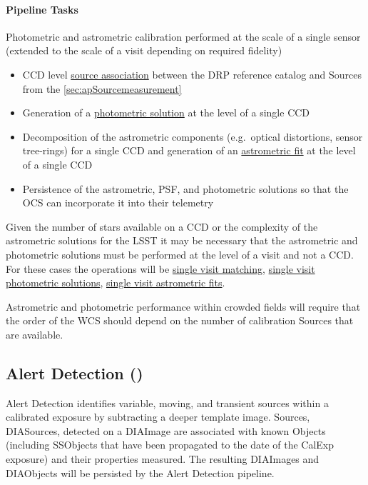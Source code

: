 \paragraph{Pipeline Tasks}
Photometric and astrometric calibration performed at the scale of a
single sensor (extended to the scale of a visit depending on required fidelity)
\begin{itemize}
\item CCD level \hyperref[sec:acSingleCCDReferenceMatching]{source
    association} between the DRP reference catalog and Sources from the \ref{sec:apSourcemeasurement}
\item Generation of a \hyperref[sec:acSingleCCDPhotometricFit]{photometric solution} at the level of a single CCD
\item Decomposition of the astrometric components (e.g.\ optical distortions, sensor tree-rings) for a single CCD and generation of an \hyperref[sec:acSingleCCDAstrometricFit]{astrometric fit} at the level of a single CCD
\item Persistence of the astrometric, PSF, and photometric solutions so that the OCS can incorporate it into their telemetry
\end{itemize}

Given the number of stars available on a CCD or the complexity of the astrometric solutions for the LSST it may be necessary that the astrometric and photometric solutions must be performed at the level of a visit and not a CCD.  For these cases the operations will be \hyperref[sec:acSingleVisitReferenceMatching]{single visit matching},   \hyperref[sec:acSingleCCDPhotometricFit]{single visit photometric solutions}, \hyperref[sec:acSingleVisitAstrometricFit]{single visit astrometric fits}.

Astrometric and photometric performance within crowded fields will require that the order of the WCS should depend on the number of calibration Sources that are available.

\subsection{Alert Detection (\wbsDiffim)}
\label{sec:apAlertDetection}

Alert Detection identifies variable, moving, and transient sources within a calibrated exposure by subtracting a deeper template image. Sources, DIASources, detected on a DIAImage are associated with known Objects (including SSObjects that have been propagated to the date of the CalExp exposure) and their properties measured. The resulting DIAImages and DIAObjects will be persisted by the Alert Detection pipeline.

